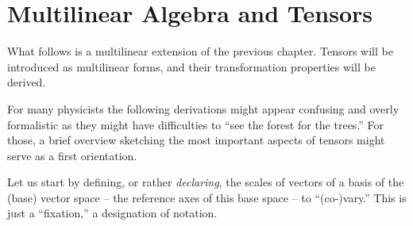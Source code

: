 \chapter{Multilinear Algebra and Tensors}
\label{ch:t}


What follows is a multilinear extension of the previous chapter.
Tensors will be introduced as multilinear forms,
and their transformation properties will be derived.


For many physicists the following derivations might appear confusing and overly formalistic
as they might have difficulties to ``see the forest for the trees.''
For those, a brief overview sketching the most important aspects of tensors might serve as a first orientation.

Let us start by defining, or rather {\em declaring}, the scales of vectors of a basis of the (base) vector space
--  the reference axes of this base space --  to ``(co-)vary.''
This is just a ``fixation,'' a designation of notation.

